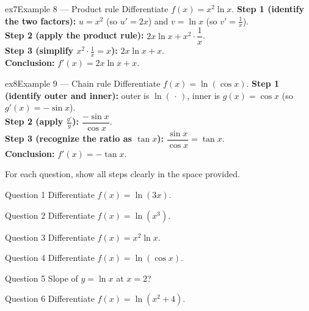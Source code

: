 \documentclass[11pt]{article}
\begin{document}
\begin{example}{ex7}{Example 8 --- Product rule}
Differentiate $f(x)=x^2\ln x$.\soln
\textbf{Step 1 (identify the two factors):} $u=x^2$ (so $u'=2x$) and $v=\ln x$ (so $v'=\tfrac1x$).\\[3pt]
\textbf{Step 2 (apply the product rule):} $2x\ln x+x^2\cdot\dfrac1x$.\\[3pt]
\textbf{Step 3 (simplify $x^2\cdot\frac1x=x$):} $2x\ln x+x$.\\[3pt]
\textbf{Conclusion:} $f'(x)=2x\ln x+x$.
\end{example}

\begin{example}{ex8}{Example 9 --- Chain rule}
Differentiate $f(x)=\ln(\cos x)$.\soln
\textbf{Step 1 (identify outer and inner):} outer is $\ln(\,\cdot\,)$, inner is $g(x)=\cos x$ (so $g'(x)=-\sin x$).\\[3pt]
\textbf{Step 2 (apply $\frac{g'}{g}$):} $\dfrac{-\sin x}{\cos x}$.\\[3pt]
\textbf{Step 3 (recognize the ratio as $\tan x$):} $\dfrac{\sin x}{\cos x}=\tan x$.\\[3pt]
\textbf{Conclusion:} $f'(x)=-\tan x$.
\end{example}

\clearpage
{}
For each question, show all steps clearly in the space provided.

\begin{qbox}{Question 1}
Differentiate $f(x)=\ln(3x)$.\workspace{2.4cm}
\end{qbox}

\begin{qbox}{Question 2}
Differentiate $f(x)=\ln(x^3)$.\workspace{2.4cm}
\end{qbox}

\begin{qbox}{Question 3}
Differentiate $f(x)=x^2\ln x$.\workspace{2.4cm}
\end{qbox}

\begin{qbox}{Question 4}
Differentiate $f(x)=\ln(\cos x)$.\workspace{2.4cm}
\end{qbox}

\begin{qbox}{Question 5}
Slope of $y=\ln x$ at $x=2$?\workspace{2.4cm}
\end{qbox}

\begin{qbox}{Question 6}
Differentiate $f(x)=\ln(x^2+4)$.\workspace{2.4cm}
\end{qbox}
\end{document}
